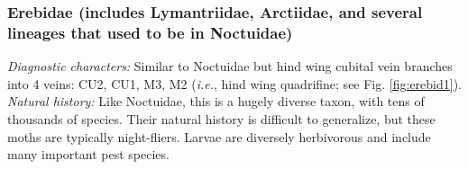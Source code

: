 \documentclass[letterpaper, 11pt]{article}
\begin{document}
\subsubsection{Erebidae (includes Lymantriidae, Arctiidae, and several lineages that used to be in Noctuidae)}
\noindent{}\textit{Diagnostic characters:} Similar to Noctuidae but hind wing cubital vein branches into 4 veins: CU2, CU1, M3, M2 (\textit{i.e.}, hind wing quadrifine; see Fig. \ref{fig:erebid1}).\\

\noindent{}\textit{Natural history:} Like Noctuidae, this is a hugely diverse taxon, with tens of thousands of species. Their natural history is difficult to generalize, but these moths are typically night-fliers. Larvae are diversely herbivorous and include many important pest species.\\
\end{document}
